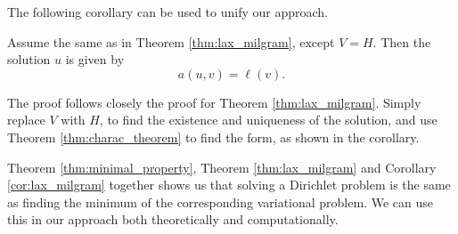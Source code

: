 The following corollary can be used to unify our approach.
\begin{kor}{\quad}
   Assume the same as in Theorem \ref{thm:lax_milgram}, except $V=H$. Then 
   the solution $u$ is given by 
   \label{cor:lax_milgram}
   \begin{equation*}
    a(u,v) = \ell(v).
   \end{equation*}
   \vspace{-8mm}
\end{kor}
\begin{bev}
    The proof follows closely the proof for Theorem \ref{thm:lax_milgram}. 
    Simply replace $V$ with $H$, to find the existence and uniqueness of the 
    solution, and use Theorem \ref{thm:charac_theorem} to find the form, as 
    shown in the corollary.
\end{bev}
Theorem \ref{thm:minimal_property}, Theorem \ref{thm:lax_milgram} and Corollary 
\ref{cor:lax_milgram} together shows us that solving a Dirichlet problem is 
the same as finding the minimum of the corresponding variational problem. 
We can use this in our approach both theoretically and computationally.